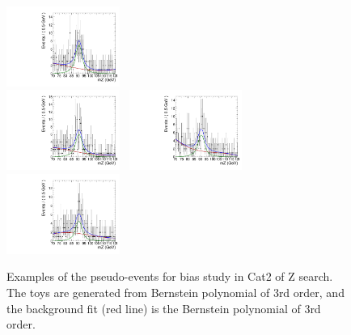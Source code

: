 \begin{figure}[!ht]
  \includegraphics[width=0.33\textwidth]{Fig/BiasStudy/Toys/ZJpsiG_Cat2/TruePdf2_FitPdf2_mu200_sbfit_1239_cat2}\\
  \includegraphics[width=0.33\textwidth]{Fig/BiasStudy/Toys/ZJpsiG_Cat2/TruePdf2_FitPdf2_mu200_sbfit_12344_cat2}~
  \includegraphics[width=0.33\textwidth]{Fig/BiasStudy/Toys/ZJpsiG_Cat2/TruePdf2_FitPdf2_mu200_sbfit_12336_cat2}~
  \includegraphics[width=0.33\textwidth]{Fig/BiasStudy/Toys/ZJpsiG_Cat2/TruePdf2_FitPdf2_mu200_sbfit_12310_cat2}\\
  \caption{Examples of the pseudo-events for bias study in Cat2 of Z search. The toys are generated from Bernstein polynomial of 3rd order, and the background fit (red line) is the Bernstein polynomial of 3rd order.}
  \label{fig:Toys_ZJpsiG_Cat2}
\end{figure}
\clearpage

